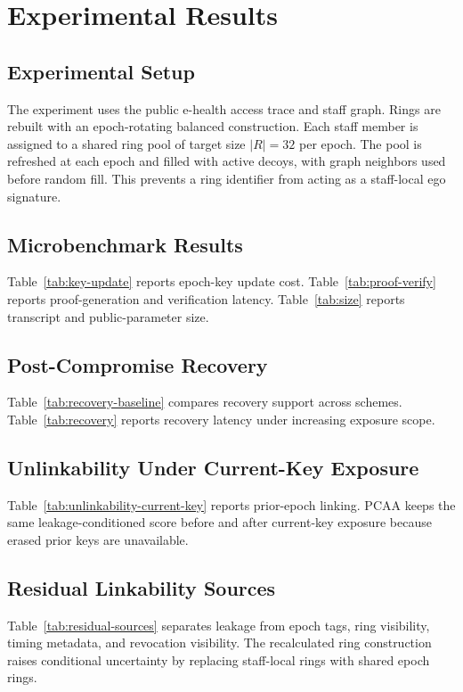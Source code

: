 \section{Experimental Results}
\label{sec:experimental-results}

\subsection{Experimental Setup}
The experiment uses the public e-health access trace and staff graph. Rings are rebuilt with an epoch-rotating balanced construction. Each staff member is assigned to a shared ring pool of target size $|R|=32$ per epoch. The pool is refreshed at each epoch and filled with active decoys, with graph neighbors used before random fill. This prevents a ring identifier from acting as a staff-local ego signature.

\subsection{Microbenchmark Results}
Table~\ref{tab:key-update} reports epoch-key update cost. Table~\ref{tab:proof-verify} reports proof-generation and verification latency. Table~\ref{tab:size} reports transcript and public-parameter size.

\subsection{Post-Compromise Recovery}
Table~\ref{tab:recovery-baseline} compares recovery support across schemes. Table~\ref{tab:recovery} reports recovery latency under increasing exposure scope.

\subsection{Unlinkability Under Current-Key Exposure}
Table~\ref{tab:unlinkability-current-key} reports prior-epoch linking. PCAA keeps the same leakage-conditioned score before and after current-key exposure because erased prior keys are unavailable.

\subsection{Residual Linkability Sources}
Table~\ref{tab:residual-sources} separates leakage from epoch tags, ring visibility, timing metadata, and revocation visibility. The recalculated ring construction raises conditional uncertainty by replacing staff-local rings with shared epoch rings.

